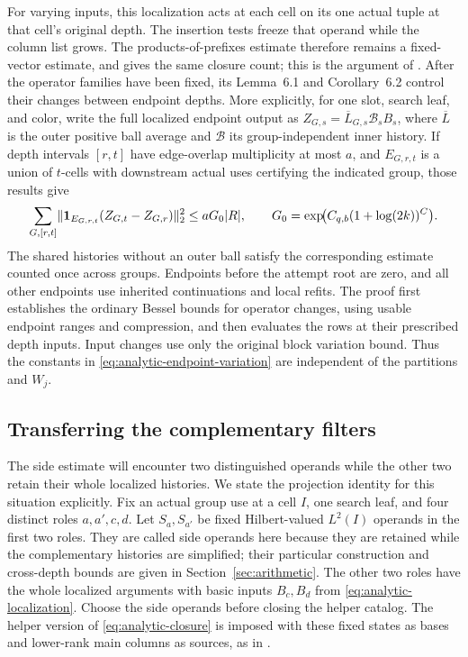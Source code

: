 For varying inputs, this localization acts at each cell on its
one actual tuple at that cell's original depth.  The insertion
tests freeze that operand while the column list grows.  The
products-of-prefixes estimate therefore remains a fixed-vector
estimate, and gives the same closure count; this is the argument
of \cite[Section~6.1]{V}.  After the operator families have been
fixed, its Lemma~6.1 and Corollary~6.2 control their changes between
endpoint depths.  More explicitly, for one slot, search leaf,
and color, write the full localized endpoint output as
\(Z_{G,s}=\overline L_{G,s}\mathcal B_s B_s\), where
\(\overline L\) is the outer positive ball average and
\(\mathcal B\) its group-independent inner history.  If depth
intervals \([r,t]\) have edge-overlap multiplicity at most \(a\),
and \(E_{G,r,t}\) is a union of \(t\)-cells with downstream actual
uses certifying the indicated group, those results give
\begin{equation}
 \sum_{G,[r,t]}
  \lVert\mathbf1_{E_{G,r,t}}(Z_{G,t}-Z_{G,r})\rVert_2^2
 \le aG_0|R|,
 \qquad G_0=\exp\!\bigl(C_{q,b}(1+\log(2k))^C\bigr).
 \label{eq:analytic-endpoint-variation}
\end{equation}
The shared histories without an outer ball satisfy the corresponding
estimate counted once across groups.  Endpoints before the attempt
root are zero, and all other endpoints use inherited continuations
and local refits.  The proof first establishes the ordinary Bessel
bounds for operator changes, using usable endpoint ranges and
compression, and then evaluates the rows at their prescribed
depth inputs.  Input changes use only the original block variation
bound.  Thus the constants in
\eqref{eq:analytic-endpoint-variation} are independent of the
partitions and \(W_j\).

\subsection{Transferring the complementary filters}

The side estimate will encounter two distinguished operands while
the other two retain their whole localized histories.  We state
the projection identity for this situation explicitly.  Fix an
actual group use at a cell \(I\), one search leaf, and four distinct
roles \(a,a',c,d\).  Let \(S_a,S_{a'}\) be fixed Hilbert-valued
\(L^2(I)\) operands in the first two roles.  They are called side
operands here because they are retained while the complementary
histories are simplified; their particular construction and
cross-depth bounds are given in Section~\ref{sec:arithmetic}.
The other two roles have the whole localized arguments with basic
inputs \(B_c,B_d\) from \eqref{eq:analytic-localization}.
Choose the side operands before closing the helper catalog.
The helper version of \eqref{eq:analytic-closure} is imposed with
these fixed states as bases and lower-rank main columns as sources,
as in \cite[Lemma~6.7]{H}.

